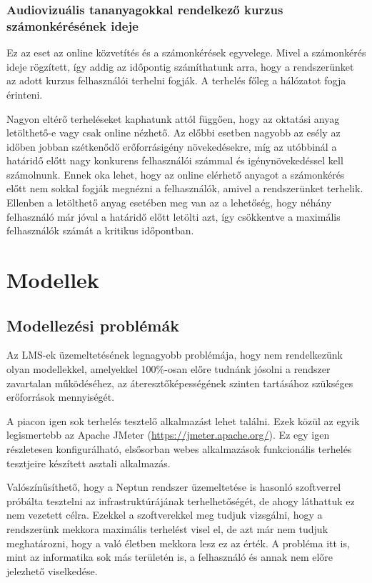 \subsubsection{Audiovizuális tananyagokkal rendelkező kurzus számonkérésének ideje}

Ez az eset az online közvetítés és a számonkérések egyvelege. Mivel a számonkérés ideje rögzített, így addig az időpontig számíthatunk arra, hogy a rendszerünket az adott kurzus felhasználói terhelni fogják. A terhelés főleg a hálózatot fogja érinteni.

Nagyon eltérő terheléseket kaphatunk attól függően, hogy az oktatási anyag letölthető-e vagy csak online nézhető. Az előbbi esetben nagyobb az esély az időben jobban szétkenődő erőforrásigény növekedésekre, míg az utóbbinál a határidő előtt nagy konkurens felhasználói számmal és igénynövekedéssel kell számolnunk. Ennek oka lehet, hogy az online elérhető anyagot a számonkérés előtt nem sokkal fogják megnézni a felhasználók, amivel a rendszerünket terhelik. Ellenben a letölthető anyag esetében meg van az a lehetőség, hogy néhány felhasználó már jóval a határidő előtt letölti azt, így csökkentve a maximális felhasználók számát a kritikus időpontban.

\section{Modellek}

\subsection{Modellezési problémák}

Az LMS-ek üzemeltetésének legnagyobb problémája, hogy nem rendelkezünk olyan modellekkel, amelyekkel 100\%-osan előre tudnánk jósolni a rendszer zavartalan működéséhez, az áteresztőképességének szinten tartásához szükséges erőforrások mennyiségét.

A piacon igen sok terhelés tesztelő alkalmazást lehet találni. Ezek közül az egyik legismertebb az Apache JMeter (\href{https://jmeter.apache.org/}{https://jmeter.apache.org/}). Ez egy igen részletesen konfigurálható, elsősorban webes alkalmazások funkcionális terhelés tesztjeire készített asztali alkalmazás.

Valószínűsíthető, hogy a Neptun rendszer üzemeltetése is hasonló szoftverrel próbálta tesztelni az infrastruktúrájának terhelhetőségét, de ahogy láthattuk ez nem vezetett célra. Ezekkel a szoftverekkel meg tudjuk vizsgálni, hogy a rendszerünk mekkora maximális terhelést visel el, de azt már nem tudjuk meghatározni, hogy a való életben mekkora lesz ez az érték. A probléma itt is, mint az informatika sok más területén is, a felhasználó és annak nem előre jelezhető viselkedése.

